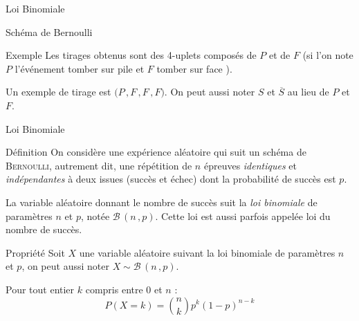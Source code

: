 \documentclass{cours}
\begin{document}
\begin{Gpartie}{Loi Binomiale}
\begin{Spartie}{Schéma de Bernoulli}
\begin{SSpartie}{Exemple}
                Les tirages obtenus sont des 4-uplets composés de $P$ et de $F$ (si l'on note $P$ l'événement \og tomber sur pile \fg{} et $F$ \og tomber sur face \fg{}).
                
                Un exemple de tirage est $\big(P\,, F\,, F\,, F\big)$. On peut aussi noter $S$ et $\overline{S}$ au lieu de $P$ et $F$.
            \end{SSpartie}
        \end{Spartie}
        \pagebreak
        \begin{Spartie}{Loi Binomiale} 
            \begin{SSpartie}{Définition} 
                On considère une expérience aléatoire qui suit un schéma de \textsc{Bernoulli}, autrement dit, une répétition de $n$ épreuves \emph{identiques} et \emph{indépendantes} à deux issues (succès et échec) dont la probabilité de succès est $p$.

                La variable aléatoire donnant le nombre de succès suit la \emph{loi binomiale} de paramètres $n$ et $p$, notée $\mathcal{B}\,\left(n\,, p\right)$. Cette loi est aussi parfois appelée loi du nombre de succès.
            \end{SSpartie}
            \begin{SSpartie}{Propriété} 
                Soit $X$ une variable aléatoire suivant la loi binomiale de paramètres $n$ et $p$, on peut aussi noter $X\sim\mathcal{B}\,\left(n\,, p\right)$.

                Pour tout entier $k$ compris entre $0$ et $n$ :
                \[\boxed{P(X=k)=\binom{n}{k}p^k(1-p)^{n-k}}\]


\end{SSpartie}
\end{Spartie}
\end{Gpartie}
\end{document}
